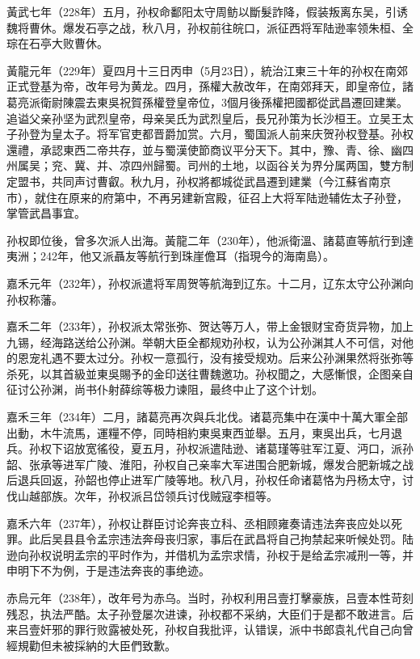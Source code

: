 黃武七年（228年）五月，孙权命鄱阳太守周鲂以斷髮詐降，假装叛离东吴，引诱魏将曹休。爆发石亭之战，秋八月，孙权前往皖口，派征西将军陆逊率领朱桓、全琮在石亭大败曹休。

黃龍元年（229年）夏四月十三日丙申（5月23日），統治江東三十年的孙权在南郊正式登基为帝，改年号为黄龙。四月，孫權大赦改年，在南郊拜天，即皇帝位，諸葛亮派衛尉陳震去東吳祝賀孫權登皇帝位，3個月後孫權把國都從武昌遷回建業。追谥父亲孙坚为武烈皇帝，母亲吴氏为武烈皇后，長兄孙策为长沙桓王。立吴王太子孙登为皇太子。将军官吏都晋爵加赏。六月，蜀国派人前来庆贺孙权登基。孙权還禮，承認東西二帝共存，並与蜀漢使節商议平分天下。其中，豫、青、徐、幽四州属吴；兖、冀、并、凉四州歸蜀。司州的土地，以函谷关为界分属两国，雙方制定盟书，共同声讨曹叡。秋九月，孙权將都城從武昌遷到建業（今江蘇省南京市），就住在原来的府第中，不再另建新宫殿，征召上大将军陆逊辅佐太子孙登，掌管武昌事宜。

孙权即位後，曾多次派人出海。黃龍二年（230年），他派衛溫、諸葛直等航行到達夷洲；242年，他又派聶友等航行到珠崖儋耳（指現今的海南島）。

嘉禾元年（232年），孙权派遣将军周贺等航海到辽东。十二月，辽东太守公孙渊向孙权称藩。

嘉禾二年（233年），孙权派太常张弥、贺达等万人，带上金银财宝奇货异物，加上九锡，经海路送给公孙渊。举朝大臣全都规劝孙权，认为公孙渊其人不可信，对他的恩宠礼遇不要太过分。孙权一意孤行，没有接受规劝。后来公孙渊果然将张弥等杀死，以其首級並東吳賜予的金印送往曹魏邀功。孙权聞之，大感慚恨，企图亲自征讨公孙渊，尚书仆射薛综等极力谏阻，最终中止了这个计划。

嘉禾三年（234年）二月，諸葛亮再次與兵北伐。诸葛亮集中在漢中十萬大軍全部出動，木牛流馬，運糧不停，同時相約東吳東西並舉。五月，東吳出兵，七月退兵。孙权下诏放宽徭役，夏五月，孙权派遣陆逊、诸葛瑾等驻军江夏、沔口，派孙韶、张承等进军广陵、淮阳，孙权自己亲率大军进围合肥新城，爆发合肥新城之战后退兵回返，孙韶也停止进军广陵等地。秋八月，孙权任命诸葛恪为丹杨太守，讨伐山越部族。次年，孙权派吕岱领兵讨伐贼寇李桓等。

嘉禾六年（237年），孙权让群臣讨论奔丧立科、丞相顾雍奏请违法奔丧应处以死罪。此后吴县县令孟宗违法奔母丧归家，事后在武昌将自己拘禁起来听候处罚。陆逊向孙权说明孟宗的平时作为，并借机为孟宗求情，孙权于是给孟宗减刑一等，并申明下不为例，于是违法奔丧的事绝迹。

赤烏元年（238年），改年号为赤乌。当时，孙权利用吕壹打擊豪族，吕壹本性苛刻残忍，执法严酷。太子孙登屡次进谏，孙权都不采纳，大臣们于是都不敢进言。后来吕壹奸邪的罪行败露被处死，孙权自我批评，认错误，派中书郎袁礼代自己向曾經規勸但未被採納的大臣們致歉。

